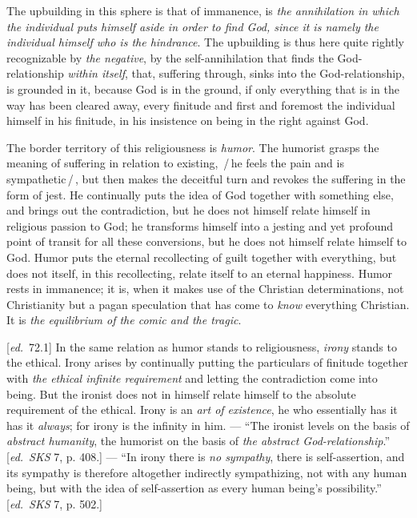 \documentclass[12pt,a4paper,openany]{book}
\newcommand{\kpage}[1]{\marginnote{\footnotesize\textit{[#1]}}}
\newcommand{\ed}[1]{{\small[\textit{ed.}\ #1]}}
\newcommand{\ins}[1]{\,/\,#1\,/\,}
\begin{document}
The upbuilding in this sphere is that of immanence, is \emph{the annihilation
in which the individual puts himself aside in order to find God, since it
is namely the individual himself who is the hindrance}. The upbuilding is thus here quite
rightly recognizable by \emph{the negative}, by the self-annihilation that finds
the God-relationship \emph{within itself}, that, suffering through, sinks into the God-relationship,
\kpage{145}is grounded in it, because God is in the ground, if only everything that is in
the way has been cleared away, every finitude and first and foremost the individual
himself in his finitude, in his insistence on being in the right against God.

The border territory of this religiousness is \emph{humor}. The humorist grasps the meaning
of suffering in relation to existing, \ins{he feels the pain
and is sympathetic}, but then makes the deceitful turn and revokes
the suffering in the form of jest. He continually puts the idea of God
together with something else, and brings out the contradiction,
but he does not himself relate himself in religious passion to God; he
transforms himself into a jesting and yet profound point of transit
for all these conversions, but he does not himself relate himself
to God. Humor puts the eternal recollecting of guilt together with
everything, but does not itself, in this recollecting, relate itself to an eternal happiness.
Humor rests in immanence; it is, when it makes use of the
Christian determinations, not Christianity but a pagan speculation
that has come to \emph{know} everything Christian. It is \emph{the equilibrium of
the comic and the tragic}.

\ed{72.1} In the same relation as humor stands to religiousness,
\emph{irony} stands to the ethical. Irony arises by continually
putting the particulars of finitude together with \emph{the ethical infinite
requirement} and letting the contradiction come into being. But the ironist does
not in himself relate himself to the absolute requirement of the ethical. Irony is an \emph{art of existence},
he who essentially has it has it \emph{always}; for irony is
the infinity in him. --- ``The ironist levels on the basis of \emph{abstract humanity},
the humorist on the basis of \emph{the abstract God-relationship}.'' \ed{\emph{SKS} 7, p. 408.}
--- ``In irony there is \emph{no sympathy}, there is self-assertion, and its sympathy
is therefore altogether indirectly sympathizing, not with any
human being, but with the idea of self-assertion as every human being's
possibility.'' \ed{\emph{SKS} 7, p. 502.}
\end{document}
